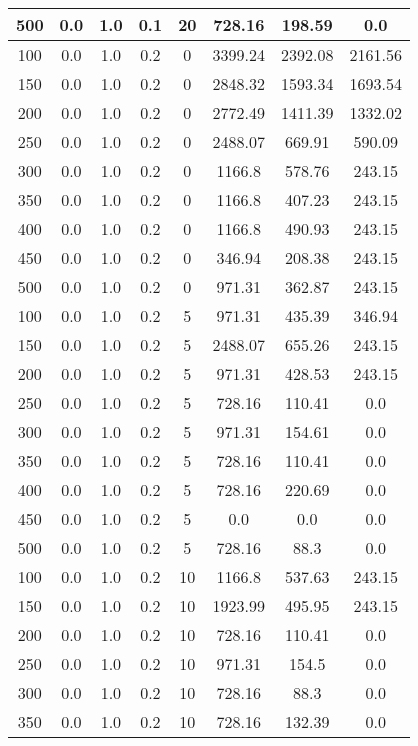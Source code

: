 \documentclass[a4paper, 12pt]{extreport}
\begin{document}
\begin{itemize}
\begin{longtable}{|c|c|c|c|c|c|c|c|}
			500 & 0.0 & 1.0 & 0.1 & 20 & 728.16 & 198.59 & 0.0 \\\hline
			100 & 0.0 & 1.0 & 0.2 & 0 & 3399.24 & 2392.08 & 2161.56 \\\hline
			150 & 0.0 & 1.0 & 0.2 & 0 & 2848.32 & 1593.34 & 1693.54 \\\hline
			200 & 0.0 & 1.0 & 0.2 & 0 & 2772.49 & 1411.39 & 1332.02 \\\hline
			250 & 0.0 & 1.0 & 0.2 & 0 & 2488.07 & 669.91 & 590.09 \\\hline
			300 & 0.0 & 1.0 & 0.2 & 0 & 1166.8 & 578.76 & 243.15 \\\hline
			350 & 0.0 & 1.0 & 0.2 & 0 & 1166.8 & 407.23 & 243.15 \\\hline
			400 & 0.0 & 1.0 & 0.2 & 0 & 1166.8 & 490.93 & 243.15 \\\hline
			450 & 0.0 & 1.0 & 0.2 & 0 & 346.94 & 208.38 & 243.15 \\\hline
			500 & 0.0 & 1.0 & 0.2 & 0 & 971.31 & 362.87 & 243.15 \\\hline
			100 & 0.0 & 1.0 & 0.2 & 5 & 971.31 & 435.39 & 346.94 \\\hline
			150 & 0.0 & 1.0 & 0.2 & 5 & 2488.07 & 655.26 & 243.15 \\\hline
			200 & 0.0 & 1.0 & 0.2 & 5 & 971.31 & 428.53 & 243.15 \\\hline
			250 & 0.0 & 1.0 & 0.2 & 5 & 728.16 & 110.41 & 0.0 \\\hline
			300 & 0.0 & 1.0 & 0.2 & 5 & 971.31 & 154.61 & 0.0 \\\hline
			350 & 0.0 & 1.0 & 0.2 & 5 & 728.16 & 110.41 & 0.0 \\\hline
			400 & 0.0 & 1.0 & 0.2 & 5 & 728.16 & 220.69 & 0.0 \\\hline
			450 & 0.0 & 1.0 & 0.2 & 5 & 0.0 & 0.0 & 0.0 \\\hline
			500 & 0.0 & 1.0 & 0.2 & 5 & 728.16 & 88.3 & 0.0 \\\hline
			100 & 0.0 & 1.0 & 0.2 & 10 & 1166.8 & 537.63 & 243.15 \\\hline
			150 & 0.0 & 1.0 & 0.2 & 10 & 1923.99 & 495.95 & 243.15 \\\hline
			200 & 0.0 & 1.0 & 0.2 & 10 & 728.16 & 110.41 & 0.0 \\\hline
			250 & 0.0 & 1.0 & 0.2 & 10 & 971.31 & 154.5 & 0.0 \\\hline
			300 & 0.0 & 1.0 & 0.2 & 10 & 728.16 & 88.3 & 0.0 \\\hline
			350 & 0.0 & 1.0 & 0.2 & 10 & 728.16 & 132.39 & 0.0 \\\hline

\end{longtable}
\end{itemize}
\end{document}
